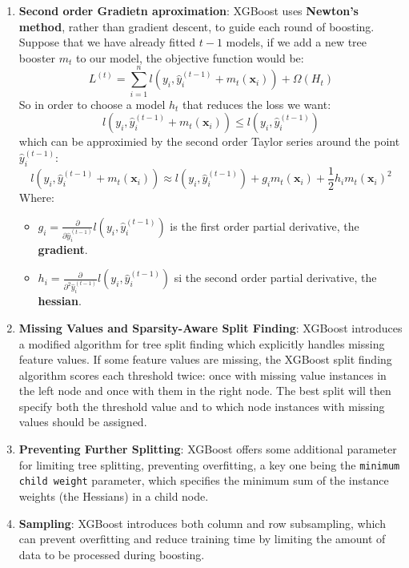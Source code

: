 \begin{enumerate}
    \item \textbf{Second order Gradietn aproximation}: XGBoost uses \textbf{Newton’s method}, rather than gradient descent, to guide each round of boosting. Suppose that we have already fitted $t-1$ models, if we add a new tree booster $m_t$ to our model, the objective function would be: 
    \[
    L^{(t)} = \sum_{i=1}^n l(y_i, \hat{y}_i^{(t-1)} + m_t(\mathbf{x}_i)) + \Omega(H_t)
    \]
    So in order to choose a model $h_t$ that reduces the loss we want: 
    \[
    l(y_i, \hat{y}_i^{(t-1)} + m_t(\mathbf{x}_i)) \le l(y_i, \hat{y}_i^{(t-1)})
    \]
    which can be approximied by the second order Taylor series around the point $\hat{y}_i^{(t-1)}$:
    \[
    l(y_i, \hat{y}_i^{(t-1)} + m_t(\mathbf{x}_i)) \approx l(y_i, \hat{y}_i^{(t-1)}) + g_i m_t(\mathbf{x}_i) + \frac{1}{2} h_i m_t(\mathbf{x}_i)^2
    \]
    Where: 
    \begin{itemize}
        \addtolength{\leftskip}{2em}
        \item $g_i = \frac{\partial}{\partial \hat{y}_i^{(t-1)}} l(y_i, \hat{y}_i^{(t-1)})$ is the first order partial derivative, the \textbf{gradient}.
        \item $h_i = \frac{\partial}{\partial^2 \hat{y}_i^{(t-1)}} l(y_i, \hat{y}_i^{(t-1)})$ si the second order partial derivative, the  \textbf{hessian}.
    \end{itemize}

    \item \textbf{Missing Values and Sparsity-Aware Split Finding}: XGBoost introduces a modified algorithm for tree split finding which explicitly handles missing feature values. If some feature values are missing, the XGBoost split finding algorithm scores each threshold twice: once with missing value instances in the left node and once with them in the right node. The best split will then specify both the threshold value and to which node instances with missing values should be assigned. 

    \item \textbf{Preventing Further Splitting}: XGBoost offers some additional parameter for limiting tree splitting, preventing overfitting, a key one being the \texttt{minimum child weight} parameter, which specifies the minimum sum of the instance weights (the Hessians) in a child node.

    \item \textbf{Sampling}: XGBoost introduces both column and row subsampling, which can prevent overfitting and reduce training time by limiting the amount of data to be processed during boosting.


\end{enumerate}
